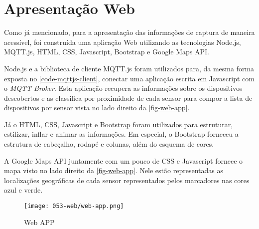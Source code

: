 \section{Apresentação Web}
\label{sec:app-web}

Como já mencionado, para a apresentação das informações de captura de maneira
acessível, foi construída uma aplicação Web utilizando as tecnologias
Node.js, MQTT.js, HTML, CSS, Javascript,
Bootstrap e Google Maps API.

Node.js e a biblioteca de cliente MQTT.js foram utilizados para,
da mesma forma exposta no \autoref{code-mqttjs-client}, conectar
uma aplicação escrita em Javascript com o \emph{MQTT Broker}. Esta
aplicação recupera as informações sobre os dispositivos descobertos e as
classifica por proximidade de cada sensor para compor a lista de dispositivos
por sensor vista no lado direito da \autoref{fig-web-app}.

Já o HTML, CSS, Javascript e Bootstrap foram
utilizados para estruturar, estilizar, inflar e animar as informações. Em
especial, o Bootstrap forneceu a estrutura de cabeçalho, rodapé e colunas,
além do esquema de cores.

A Google Maps API juntamente com um pouco de CSS e
Javascript fornece o mapa visto no lado direito da \autoref{fig-web-app}.
Nele estão representadas as localizações geográficas de cada sensor
representados pelos marcadores nas cores azul e verde.

\begin{figure}[htb]
	\caption{\label{fig-web-app}Web APP}
	\begin{center}
		\texttt{[image: 053-web/web-app.png]}
	\end{center}
\end{figure}
